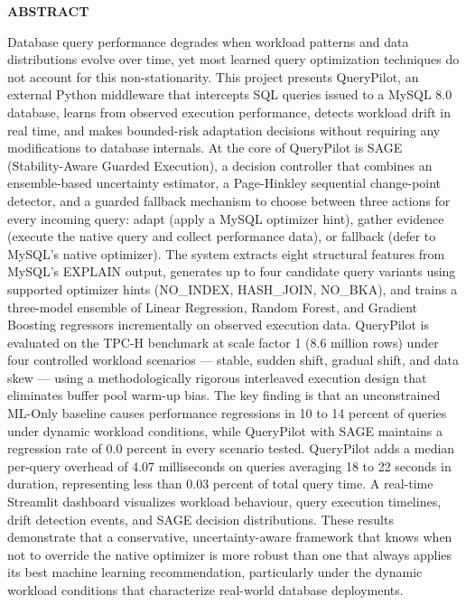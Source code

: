 
\clearpage
\thispagestyle{plain}

\begin{center}
  \vspace*{0.5cm}
  {\SubTitleSize\bfseries ABSTRACT\par}
\end{center}

\vspace{1cm}

\begin{doublespace}
\setlength{\parindent}{1.27cm}

\indent Database query performance degrades when workload patterns and data distributions evolve over time, yet most learned query optimization techniques do not account for this non-stationarity. This project presents QueryPilot, an external Python middleware that intercepts SQL queries issued to a MySQL 8.0 database, learns from observed execution performance, detects workload drift in real time, and makes bounded-risk adaptation decisions without requiring any modifications to database internals. At the core of QueryPilot is SAGE (Stability-Aware Guarded Execution), a decision controller that combines an ensemble-based uncertainty estimator, a Page-Hinkley sequential change-point detector, and a guarded fallback mechanism to choose between three actions for every incoming query: adapt (apply a MySQL optimizer hint), gather evidence (execute the native query and collect performance data), or fallback (defer to MySQL's native optimizer). The system extracts eight structural features from MySQL's EXPLAIN output, generates up to four candidate query variants using supported optimizer hints (NO\_INDEX, HASH\_JOIN, NO\_BKA), and trains a three-model ensemble of Linear Regression, Random Forest, and Gradient Boosting regressors incrementally on observed execution data. QueryPilot is evaluated on the TPC-H benchmark at scale factor 1 (8.6 million rows) under four controlled workload scenarios — stable, sudden shift, gradual shift, and data skew — using a methodologically rigorous interleaved execution design that eliminates buffer pool warm-up bias. The key finding is that an unconstrained ML-Only baseline causes performance regressions in 10 to 14 percent of queries under dynamic workload conditions, while QueryPilot with SAGE maintains a regression rate of 0.0 percent in every scenario tested. QueryPilot adds a median per-query overhead of 4.07 milliseconds on queries averaging 18 to 22 seconds in duration, representing less than 0.03 percent of total query time. A real-time Streamlit dashboard visualizes workload behaviour, query execution timelines, drift detection events, and SAGE decision distributions. These results demonstrate that a conservative, uncertainty-aware framework that knows when not to override the native optimizer is more robust than one that always applies its best machine learning recommendation, particularly under the dynamic workload conditions that characterize real-world database deployments.

\end{doublespace}
